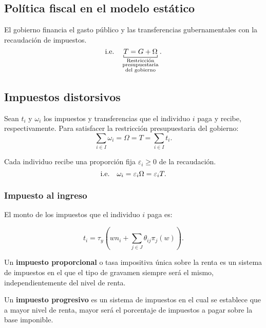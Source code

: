 \documentclass[8pt,a4paper]{extarticle}
\begin{document}
\begin{multicols}{3}
\sectionbreak

\section{Política fiscal en el modelo estático}

\begin{boxrmk}[]
	El gobierno financia el gasto público y las transferencias gubernamentales con la recaudación de impuestos.
	\[
		\ie \quad \underbracket[0.5pt]{ T = G + \Omega}_{\substack{\text{\normalfont Restricción} \\ \text{\normalfont presupuestaria} \\ \text{\normalfont del gobierno}}}
	.\] 
\end{boxrmk}

\subsection{Impuestos distorsivos}

\begin{boxprop}[]
	Sean $t_i$ y $\omega_i$ los impuestos y transferencias que el individuo $i$ paga y recibe, respectivamente. Para satisfacer la restricción presupuestaria del gobierno:
	\[
	\sum_{i \in I} \omega_i = \Omega = T = \sum_{i \in I} t_i
	.\] 
\end{boxprop}

\begin{boxprop}[]
	Cada individuo recibe una proporción fija $\varepsilon_i \ge 0$ de la recaudación.
	\[
	\text{\normalfont i.e.} \quad \omega_i = \varepsilon_i\Omega = \varepsilon_i T
	.\] 
\end{boxprop}

\subsubsection{Impuesto al ingreso}

El monto de los impuestos que el individuo $i$ paga es:

\[
	t_i = \tau_y \left( wn_i + \sum_{j \in J} \theta_{ij} \pi_j (w) \right) 
.\] 

\begin{boxdef}
	Un \textbf{impuesto proporcional} o tasa impositiva única sobre la renta es un sistema de impuestos en el que el tipo de gravamen siempre será el mismo, independientemente del nivel de renta.
\end{boxdef}

\begin{boxdef}
	Un \textbf{impuesto progresivo} es un sistema de impuestos en el cual se establece que a mayor nivel de renta, mayor será el porcentaje de impuestos a pagar sobre la base imponible. 
\end{boxdef}


\end{multicols}
\end{document}
